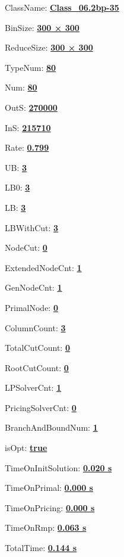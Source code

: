 \documentclass[11pt]{article}
\begin{document}
\pagestyle{empty}


ClassName: \underline{\textbf{Class_06.2bp-35}}
\par
BinSize: \underline{\textbf{300 × 300}}
\par
ReduceSize: \underline{\textbf{300 × 300}}
\par
TypeNum: \underline{\textbf{80}}
\par
Num: \underline{\textbf{80}}
\par
OutS: \underline{\textbf{270000}}
\par
InS: \underline{\textbf{215710}}
\par
Rate: \underline{\textbf{0.799}}
\par
UB: \underline{\textbf{3}}
\par
LB0: \underline{\textbf{3}}
\par
LB: \underline{\textbf{3}}
\par
LBWithCut: \underline{\textbf{3}}
\par
NodeCut: \underline{\textbf{0}}
\par
ExtendedNodeCnt: \underline{\textbf{1}}
\par
GenNodeCnt: \underline{\textbf{1}}
\par
PrimalNode: \underline{\textbf{0}}
\par
ColumnCount: \underline{\textbf{3}}
\par
TotalCutCount: \underline{\textbf{0}}
\par
RootCutCount: \underline{\textbf{0}}
\par
LPSolverCnt: \underline{\textbf{1}}
\par
PricingSolverCnt: \underline{\textbf{0}}
\par
BranchAndBoundNum: \underline{\textbf{1}}
\par
isOpt: \underline{\textbf{true}}
\par
TimeOnInitSolution: \underline{\textbf{0.020 s}}
\par
TimeOnPrimal: \underline{\textbf{0.000 s}}
\par
TimeOnPricing: \underline{\textbf{0.000 s}}
\par
TimeOnRmp: \underline{\textbf{0.063 s}}
\par
TotalTime: \underline{\textbf{0.144 s}}
\par
\newpage
\end{document}
